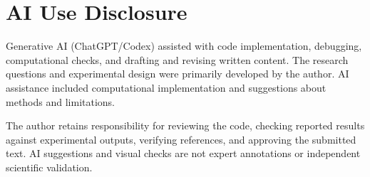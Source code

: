 \chapter{AI Use Disclosure}

Generative AI (ChatGPT/Codex) assisted with code implementation, debugging, computational checks, and drafting and revising written content. The research questions and experimental design were primarily developed by the author. AI assistance included computational implementation and suggestions about methods and limitations.

The author retains responsibility for reviewing the code, checking reported results against experimental outputs, verifying references, and approving the submitted text. AI suggestions and visual checks are not expert annotations or independent scientific validation.
